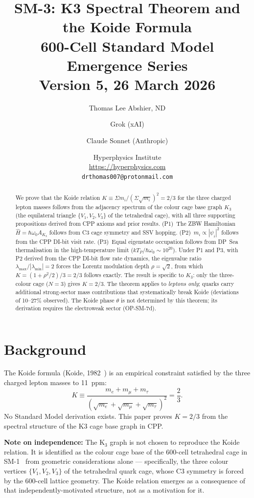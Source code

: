 \documentclass[11pt]{article}
\title{\textbf{SM-3: K3 Spectral Theorem and the Koide Formula}\\[6pt]
{\large 600-Cell Standard Model Emergence Series}\\[4pt]
{\normalsize Version 5, 26 March 2026}}
\author{Thomas Lee Abshier, ND \and Grok (xAI) \and Claude Sonnet (Anthropic)}
\date{\normalsize Hyperphysics Institute\\
\url{https://hyperphysics.com}\\
\texttt{drthomas007@protonmail.com}}
\begin{document}
\maketitle

\begin{abstract}
We prove that the Koide relation $K \equiv \Sigma m_i/(\Sigma\sqrt{m_i})^2 = 2/3$
for the three charged lepton masses follows from the adjacency spectrum of
the colour cage base graph $K_3$ (the equilateral triangle $\{V_1,V_2,V_3\}$
of the tetrahedral cage), with all three supporting propositions derived from
CPP axioms and prior results.
(P1)~The ZBW Hamiltonian $\hat{H} = \hbar\omega_0 A_{K_3}$ follows from
C3 cage symmetry and SSV hopping.
(P2)~$m_i \propto |\psi_i|^2$ follows from the CPP DI-bit visit rate.
(P3)~Equal eigenstate occupation follows from DP~Sea thermalisation in the
high-temperature limit ($kT_P/\hbar\omega_0 \sim 10^{20}$).
Under P1 and P3, with P2 derived from the CPP DI-bit flow rate dynamics,
the eigenvalue ratio $\lambda_{\max}/|\lambda_{\min}| = 2$
forces the Lorentz modulation depth $\rho = \sqrt{2}$, from which
$K = (1+\rho^2/2)/3 = 2/3$ follows exactly.
The result is specific to $K_3$: only the three-colour cage ($N=3$) gives
$K = 2/3$.  The theorem applies to \emph{leptons only}; quarks carry
additional strong-sector mass contributions that systematically break
Koide (deviations of 10--27\% observed).
The Koide phase $\theta$ is not determined by this theorem;
its derivation requires the electroweak sector (OP-SM-7d).
\end{abstract}

\section{Background}

The Koide formula (Koide, 1982~\cite{koide1982}) is an empirical constraint
satisfied by the three charged lepton masses to 11~ppm:
\begin{equation}
K \equiv \frac{m_e + m_\mu + m_\tau}{(\sqrt{m_e}+\sqrt{m_\mu}+\sqrt{m_\tau})^2}
= \frac{2}{3}.
\label{eq:koide}
\end{equation}
No Standard Model derivation exists.  This paper proves $K = 2/3$ from
the spectral structure of the K3 cage base graph in CPP.

\textbf{Note on independence:} The K$_3$ graph is not chosen to reproduce
the Koide relation.  It is identified as the colour cage base of the
600-cell tetrahedral cage in SM-1~\cite{abshier_sm1} from geometric
considerations alone --- specifically, the three colour vertices
$\{V_1,V_2,V_3\}$ of the tetrahedral quark cage, whose C3 symmetry is
forced by the 600-cell lattice geometry.  The Koide relation emerges
as a consequence of that independently-motivated structure, not as a
motivation for it.
\end{document}
